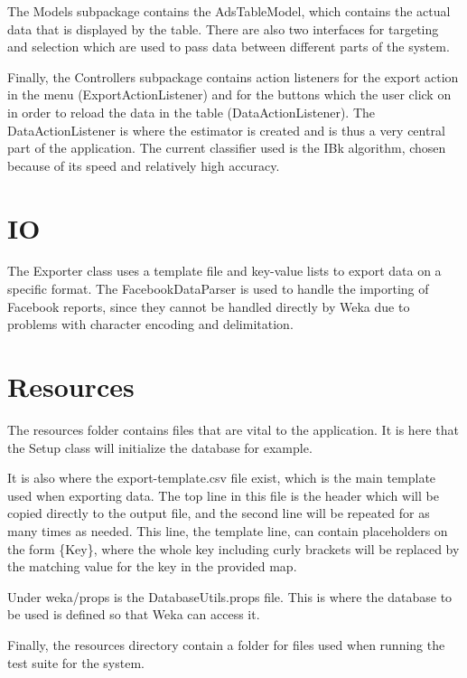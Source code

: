 \documentclass[11pt,twoside,a4paper]{article}
\begin{document}
The Models subpackage contains the AdsTableModel, which contains the actual data that is displayed by the table. There are also two interfaces for targeting and selection which are used to pass data between different parts of the system.

Finally, the Controllers subpackage contains action listeners for the export action in the menu (ExportActionListener) and for the buttons which the user click on in order to reload the data in the table (DataActionListener). The DataActionListener is where the estimator is created and is thus a very central part of the application. The current classifier used is the IBk algorithm, chosen because of its speed and relatively high accuracy.

\section{IO}
The Exporter class uses a template file and key-value lists to export data on a specific format. The FacebookDataParser is used to handle the importing of Facebook reports, since they cannot be handled directly by Weka due to problems with character encoding and delimitation.

\section{Resources}
The resources folder contains files that are vital to the application. It is here that the Setup class will initialize the database for example.

It is also where the export-template.csv file exist, which is the main template used when exporting data. The top line in this file is the header which will be copied directly to the output file, and the second line will be repeated for as many times as needed. This line, the template line, can contain placeholders on the form \{Key\}, where the whole key including curly brackets will be replaced by the matching value for the key in the provided map.

Under weka/props is the DatabaseUtils.props file. This is where the database to be used is defined so that Weka can access it.

Finally, the resources directory contain a folder for files used when running the test suite for the system.
\end{document}
